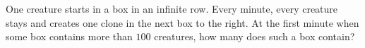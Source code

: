 One creature starts in a box in an infinite row. Every minute, every creature stays and creates one clone in the next box to the right. At the first minute when some box contains more than $100$ creatures, how many does such a box contain?
